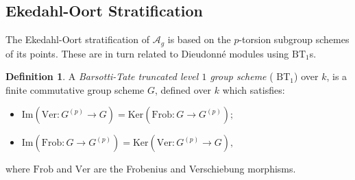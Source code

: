 \documentclass[11pt,table]{amsart}
\numberwithin{equation}{section}
\theoremstyle{definition}
\newtheorem{defn}[thm]{Definition}
\theoremstyle{remark}
\theoremstyle{remark}
\begin{document}
\subsection{Ekedahl-Oort Stratification} \label{eostrat}
The Ekedahl-Oort stratification of $\mathcal{A}_g$ is based on the $p$-torsion subgroup schemes of its points. These are in turn related to Dieudonn{\'e} modules using $\text{BT}_1$s. 
\begin{defn}
A \textit{Barsotti-Tate truncated level $1$ group scheme} ( $\text{BT}_{1}$) over $k$, is a finite commutative group scheme $G$, defined over $k$ which satisfies:
\begin{itemize}
    \item[(i)] $\text{Im}( \mathrm{Ver} : G^{(p)} \rightarrow G) = \text{Ker}(\mathrm{Frob} : G \rightarrow G^{(p)});$
    \item[(ii)] $\text{Im}( \mathrm{Frob} : G \rightarrow G^{(p)}) = \text{Ker}(\mathrm{Ver} : G^{(p)} \rightarrow G),$ 
\end{itemize}
where $\mathrm{Frob}$ and $\mathrm{Ver}$ are the Frobenius and Verschiebung morphisms. %
\end{defn}
\end{document}
